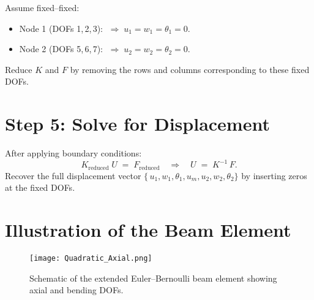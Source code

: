 \documentclass{article}
\begin{document}
	Assume fixed–fixed:
	\begin{itemize}
		\item Node 1 (DOFs 1,\,2,\,3): \(\;\Rightarrow\;u_1 = w_1 = \theta_1 = 0.\)
		\item Node 2 (DOFs 5,\,6,\,7): \(\;\Rightarrow\;u_2 = w_2 = \theta_2 = 0.\)
	\end{itemize}
	Reduce \(K\) and \(F\) by removing the rows and columns corresponding to these fixed DOFs.
	
	\section*{Step 5: Solve for Displacement}
	
	After applying boundary conditions:
	\[
	K_{\mathrm{reduced}}\;U \;=\; F_{\mathrm{reduced}}
	\quad\Longrightarrow\quad
	U \;=\; K^{-1}\,F.
	\]
	Recover the full displacement vector
	\(\{\,u_1, w_1, \theta_1, u_m, u_2, w_2, \theta_2\}\)
	by inserting zeros at the fixed DOFs.
	\newpage
	\section{Illustration of the Beam Element}
	\begin{figure}[h]
		\centering
		\texttt{[image: Quadratic\_Axial.png]}
		\caption{Schematic of the extended Euler--Bernoulli beam element showing axial and bending DOFs.}
		\label{fig:beam-element}
	\end{figure}
	
	
\end{document}
